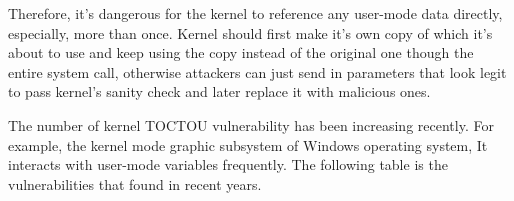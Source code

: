 Therefore, it's dangerous for the kernel to reference any user-mode data directly, especially, more than once. Kernel should first make it's own copy of which it's about to use and keep using the copy instead of the original one though the entire system call, otherwise attackers can just send in parameters that look legit to pass kernel's sanity check and later replace it with malicious ones.

The number of kernel TOCTOU vulnerability has been increasing recently. For example, the kernel mode graphic subsystem of Windows operating system, It interacts with user-mode variables frequently. The following table is the vulnerabilities that found in recent years.

\begin{comment}


\begin{table}[]
\centering
\caption{My caption}
\label{my-label}
\begin{tabular}{|l|l|l|l|}
\hline
CVE-2013-1248 & CVE-2013-1258 & CVE-2013-1268 & CVE-2013-1279 \\
CVE-2013-1249 & CVE-2013-1259 & CVE-2013-1269 & CVE-2013-1280 \\
CVE-2013-1250 & CVE-2013-1260 & CVE-2013-1270 & CVE-2015-6101 \\
CVE-2013-1251 & CVE-2013-1261 & CVE-2013-1271 & CVE-2010-1888 \\
CVE-2013-1252 & CVE-2013-1262 & CVE-2013-1272 & CVE-2008-2252 \\
CVE-2013-1253 & CVE-2013-1263 & CVE-2013-1273 & CVE-2017-11830 \\
CVE-2013-1254 & CVE-2013-1264 & CVE-2013-1275 &  \\
CVE-2013-1255 & CVE-2013-1265 & CVE-2013-1276 &  \\
CVE-2013-1256 & CVE-2013-1266 & CVE-2013-1277 &  \\
CVE-2013-1257 & CVE-2013-1267 & CVE-2013-1278 &  \\ \hline
\end{tabular}
\end{table}
\end{comment}


